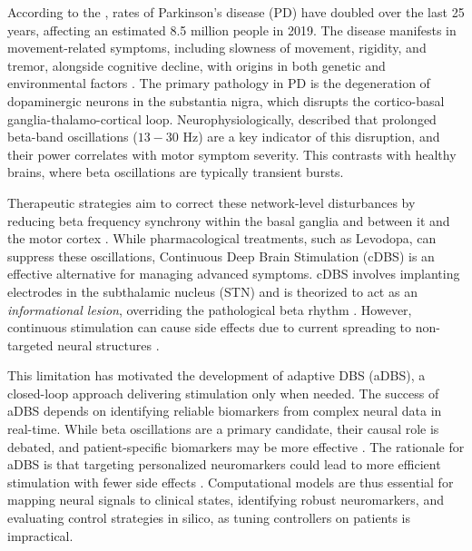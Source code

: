 \documentclass[12pt, a4paper]{article}
\begin{document}
According to the \textcite{who_parkinson_2023}, rates of Parkinson's disease (PD) have doubled over the last 25 years, affecting an estimated 8.5 million people in 2019. The disease manifests in movement-related symptoms, including slowness of movement, rigidity, and tremor, alongside cognitive decline, with origins in both genetic and environmental factors \parencite{ben-shlomoEpidemiologyParkinsonsDisease2024}. The primary pathology in PD is the degeneration of dopaminergic neurons in the substantia nigra, which disrupts the cortico-basal ganglia-thalamo-cortical loop. Neurophysiologically, \textcite{tinkhauserBetaBurstDynamics2017} described that prolonged beta-band oscillations ($13-30$ Hz) are a key indicator of this disruption, and their power correlates with motor symptom severity. This contrasts with healthy brains, where beta oscillations are typically transient bursts.

Therapeutic strategies aim to correct these network-level disturbances by reducing beta frequency synchrony within the basal ganglia and between it and the motor cortex \parencite{tinkhauserBetaBurstDynamics2017, paulsCorticalBetaBurst2022}. While pharmacological treatments, such as Levodopa, can suppress these oscillations, Continuous Deep Brain Stimulation (cDBS) is an effective alternative for managing advanced symptoms. cDBS involves implanting electrodes in the subthalamic nucleus (STN) and is theorized to act as an \textit{informational lesion}, overriding the pathological beta rhythm \parencite{chikenMechanismDeepBrain2016, mcintyreNetworkPerspectivesMechanisms2010}. However, continuous stimulation can cause side effects due to current spreading to non-targeted neural structures \parencite{zarzyckiStimulationinducedSideEffects2020}.

This limitation has motivated the development of adaptive DBS (aDBS), a closed-loop approach delivering stimulation only when needed. The success of aDBS depends on identifying reliable biomarkers from complex neural data in real-time. While beta oscillations are a primary candidate, their causal role is debated, and patient-specific biomarkers may be more effective \parencite{swannGammaOscillationsHyperkinetic2016, wuComputationalModelsAdvance2024}. The rationale for aDBS is that targeting personalized neuromarkers could lead to more efficient stimulation with fewer side effects \parencite{littleAdaptiveDeepBrain2013}. Computational models are thus essential for mapping neural signals to clinical states, identifying robust neuromarkers, and evaluating control strategies in silico, as tuning controllers on patients is impractical.
\end{document}
